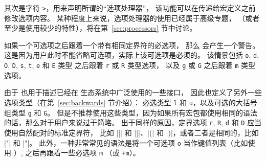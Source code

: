 \documentclass{l3doc}
\begin{document}
%
其次是字符 \texttt{>}，用来声明所谓的“选项处理器”，
该功能可以在传递给宏定义之前修改选项内容。
某种程度上来说，选项处理器的使用已经属于高级专题，
（或者至少是使用较少的特性），将在第~\ref{sec:processors} 节中讨论。

%
如果一个可选项之后跟着一个带有相同定界符的必选项，
那么  会产生一个警告。
这是因为用户此时不能省略可选项，实际上该可选项是必须的。
该情景包括 \texttt{o}, \texttt{d}, \texttt{O}, \texttt{D}, \texttt{s}, \texttt{t}, \texttt{e} 和 \texttt{E} 类型
之后跟着 \texttt{r} 或 \texttt{R} 类型选项，
以及 \texttt{g} 或 \texttt{G} 之后跟着 \texttt{m} 类型选项。

%
由于  也用于描述已经在 \LaTeXe{} 生态系统中广泛使用的一些接口，
因此也定义了另外一些选项类型（在第~\ref{sec:backwards} 节介绍）：
必选类型 \texttt{l} 和 \texttt{u}，以及可选的大括号组类型 \texttt{g} 和 \texttt{G}。
但是不推荐使用这些类型，因为如果所有宏包都使用相同的语法的话，那么对于用户来说过于简略。
出于同样的原因，定界选项 \texttt{r}, \texttt{R}, \texttt{d} 和 \texttt{D} 应当使用自然配对的标准定界符，
比如 |[| 和 |]|、|(| 和 |)|，或者二者是相同的，比如 |"| 和 |"|。
此外，一种非常常见的语法是将一个可选项 \texttt{o} 当作键值列表（比如使用 ）,
之后再跟着一些必选项 \texttt{m} （或 \texttt{+m}）。
\end{document}
